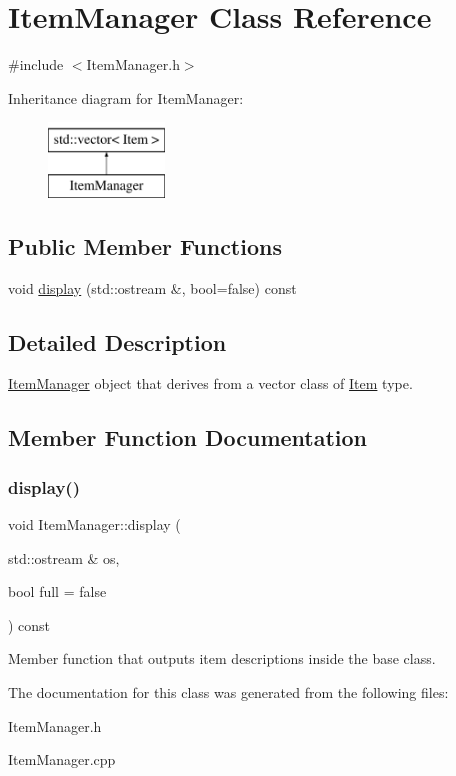 \hypertarget{classItemManager}{}\section{Item\+Manager Class Reference}
\label{classItemManager}


{\ttfamily \#include $<$Item\+Manager.\+h$>$}

Inheritance diagram for Item\+Manager\+:\begin{figure}[H]
\begin{center}
\leavevmode
\includegraphics[height=2.000000cm]{classItemManager}
\end{center}
\end{figure}
\subsection*{Public Member Functions}
\begin{DoxyCompactItemize}
\item 
void \mbox{\hyperlink{classItemManager_ad3e190ba89c34cdaa4b11ecbdb6e8722}{display}} (std\+::ostream \&, bool=false) const
\end{DoxyCompactItemize}


\subsection{Detailed Description}
\mbox{\hyperlink{classItemManager}{Item\+Manager}} object that derives from a vector class of \mbox{\hyperlink{classItem}{Item}} type. 

\subsection{Member Function Documentation}
\mbox{\label{classItemManager_ad3e190ba89c34cdaa4b11ecbdb6e8722}} 
\subsubsection{\texorpdfstring{display()}{display()}}
{\footnotesize\ttfamily void Item\+Manager\+::display (\begin{DoxyParamCaption}\item[{std\+::ostream \&}]{os,  }\item[{bool}]{full = {\ttfamily false} }\end{DoxyParamCaption}) const}

Member function that outputs item descriptions inside the base class. 

The documentation for this class was generated from the following files\+:\begin{DoxyCompactItemize}
\item 
Item\+Manager.\+h\item 
Item\+Manager.\+cpp\end{DoxyCompactItemize}
